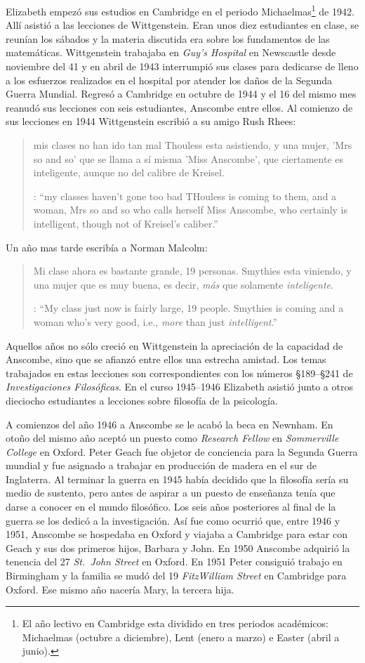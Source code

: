 Elizabeth empezó sus estudios en Cambridge en el periodo Michaelmas\footnote{El año lectivo en Cambridge esta dividido en tres periodos académicos: Michaelmas (octubre a diciembre), Lent (enero a marzo) e Easter (abril a junio).} de 1942. Allí asistió a las lecciones de Wittgenstein. Eran unos diez estudiantes en clase, se reunían los sábados y la materia discutida era sobre los fundamentos de las matemáticas. Wittgenstein trabajaba en \emph{Guy's Hospital} en Newscastle desde noviembre del 41 y en abril de 1943 interrumpió sus clases para dedicarse de lleno a los esfuerzos realizados en el hospital por atender los daños de la Segunda Guerra Mundial. Regresó a Cambridge en octubre de 1944 y el 16 del mismo mes reanudó sus lecciones con seis estudiantes, Anscombe entre ellos. Al comienzo de sus lecciones en 1944 Wittgenstein escribió a su amigo Rush Rhees: \blockquote[{\cite[371]{wittgenstein2012letters}}: \enquote{my classes haven't gone too bad \textelp{} THouless is coming to them, and a woman, Mrs so and so who calls herself Miss Anscombe, who certainly is intelligent, though not of Kreisel's caliber.}]{mis clases no han ido tan mal \textelp{} Thouless esta asistiendo, y una mujer, 'Mrs so and so' que se llama a sí misma 'Miss Anscombe', que ciertamente es inteligente, aunque no del calibre de Kreisel.} Un año mas tarde escribía a Norman Malcolm: \blockquote[{\cite[388]{wittgenstein2012letters}}: \enquote{My class just now is fairly large, 19 people. \textelp{} Smythies is coming and a woman who's very good, i.e., \emph{more} than just \emph{intelligent}.}]{Mi clase ahora es bastante grande, 19 personas. \textelp{} Smythies esta viniendo, y una mujer que es muy buena, es decir, \emph{más} que solamente \emph{inteligente}.} Aquellos años no sólo creció en Wittgenstein la apreciación de la capacidad de Anscombe, sino que se afianzó entre ellos una estrecha amistad. Los temas trabajados en estas lecciones son correspondientes con los números \S189--\S241 de \emph{Investigaciones Filosóficas}. En el curso 1945--1946 Elizabeth asistió junto a otros dieciocho estudiantes a lecciones sobre filosofía de la psicología.\autocite[Cf.~][354--356]{KlaggeNordman2003pubnpriv}

A comienzos del año 1946 a Anscombe se le acabó la beca en Newnham. En otoño del mismo año aceptó un puesto como \emph{Research Fellow} en \emph{Sommerville College} en Oxford. Peter Geach fue objetor de conciencia para la Segunda Guerra mundial y fue asignado a trabajar en producción de madera en el sur de Inglaterra.\autocite[Cf.~][34]{teichman2002fellows} Al terminar la guerra en 1945 había decidido que la filosofía sería su medio de sustento, pero antes de aspirar a un puesto de enseñanza tenía que darse a conocer en el mundo filosófico.\autocite[Cf.~][12]{geach1991philaut} Los seis años posteriores al final de la guerra se los dedicó a la investigación. Así fue como ocurrió que, entre 1946 y 1951, Anscombe se hospedaba en Oxford y viajaba a Cambridge para estar con Geach y sus dos primeros hijos, Barbara y John. En 1950 Anscombe adquirió la tenencia del 27 \emph{St.~John Street} en Oxford. En 1951 Peter consiguió trabajo en Birmingham y la familia se mudó del 19 \emph{FitzWilliam Street} en Cambridge para Oxford.\autocite[Cf.~][208]{NWR} Ese mismo año nacería Mary, la tercera hija.

